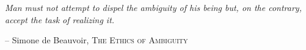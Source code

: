 \thispagestyle{empty}


\vspace*{5cm}

\medskip

\begin{center}
\noindent
\textit{Man must not attempt to dispel the ambiguity of his being but, on the contrary, accept the task of realizing it.} \\
\end{center}

\begin{flushright}
-- Simone de Beauvoir, \textsc{The Ethics of Ambiguity}
\end{flushright}
